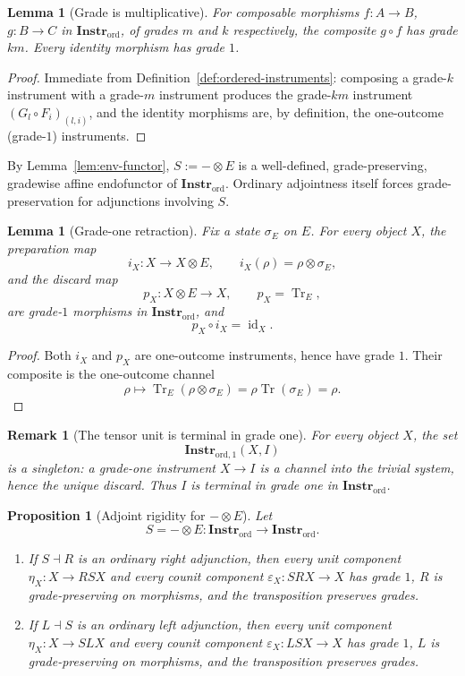 \documentclass[11pt]{article}
\newtheorem{proposition}[theorem]{Proposition}
\newtheorem{lemma}[theorem]{Lemma}
\newtheorem{remark}[theorem]{Remark}
\DeclareMathOperator{\Tr}{Tr}
\DeclareMathOperator{\id}{id}
\begin{document}
\begin{lemma}[Grade is multiplicative]
\label{lem:grade-mult}
For composable morphisms $f:A\to B$, $g:B\to C$ in
$\mathbf{Instr}_{\mathrm{ord}}$, of grades $m$ and $k$ respectively, the
composite $g\circ f$ has grade $km$. Every identity morphism has grade $1$.
\end{lemma}

\begin{proof}
Immediate from Definition~\ref{def:ordered-instruments}: composing a
grade-$k$ instrument with a grade-$m$ instrument produces the grade-$km$
instrument $(G_l\circ F_i)_{(l,i)}$, and the identity morphisms are, by
definition, the one-outcome (grade-$1$) instruments.
\end{proof}

By Lemma~\ref{lem:env-functor}, $S:=-\otimes E$ is a well-defined,
grade-preserving, gradewise affine endofunctor of
$\mathbf{Instr}_{\mathrm{ord}}$. Ordinary adjointness itself forces
grade-preservation for adjunctions involving $S$.

\begin{lemma}[Grade-one retraction]
\label{lem:retraction}
Fix a state $\sigma_E$ on $E$. For every object $X$, the preparation map
\[
i_X:X\to X\otimes E,
\qquad
i_X(\rho)=\rho\otimes\sigma_E,
\]
and the discard map
\[
p_X:X\otimes E\to X,
\qquad
p_X=\Tr_E,
\]
are grade-$1$ morphisms in $\mathbf{Instr}_{\mathrm{ord}}$, and
\[
p_X\circ i_X=\id_X.
\]
\end{lemma}

\begin{proof}
Both $i_X$ and $p_X$ are one-outcome instruments, hence have grade $1$.
Their composite is the one-outcome channel
\[
\rho\longmapsto\Tr_E(\rho\otimes\sigma_E)=\rho\Tr(\sigma_E)=\rho.
\]
\end{proof}

\begin{remark}[The tensor unit is terminal in grade one]
\label{rem:instr-terminal-grade-one}
For every object $X$, the set
\[
\mathbf{Instr}_{\mathrm{ord},1}(X,I)
\]
is a singleton: a grade-one instrument $X\to I$ is a channel into the
trivial system, hence the unique discard. Thus $I$ is terminal in grade one
in $\mathbf{Instr}_{\mathrm{ord}}$.
\end{remark}

\begin{proposition}[Adjoint rigidity for $-\otimes E$]
\label{prop:adjointrigidity}
Let
\[
S=-\otimes E:\mathbf{Instr}_{\mathrm{ord}}\to
\mathbf{Instr}_{\mathrm{ord}}.
\]
\begin{enumerate}
\item If $S\dashv R$ is an ordinary right adjunction, then every unit
component $\eta_X:X\to RSX$ and every counit component
$\varepsilon_X:SRX\to X$ has grade $1$, $R$ is grade-preserving on
morphisms, and the transposition preserves grades.
\item If $L\dashv S$ is an ordinary left adjunction, then every unit
component $\eta_X:X\to SLX$ and every counit component
$\varepsilon_X:LSX\to X$ has grade $1$, $L$ is grade-preserving on
morphisms, and the transposition preserves grades.
\end{enumerate}
\end{proposition}
\end{document}
